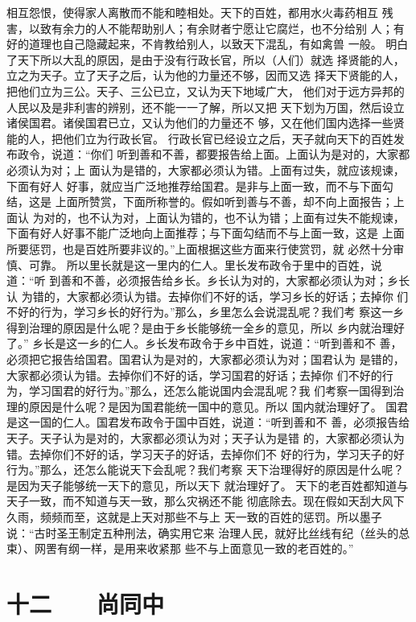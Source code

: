 \documentclass[12pt,UTF8]{ctexbook}
\begin{document}
相互怨恨，使得家人离散而不能和睦相处。天下的百姓，都用水火毒药相互 
残害，以致有余力的人不能帮助别人；有余财者宁愿让它腐烂，也不分给别 
人；有好的道理也自己隐藏起来，不肯教给别人，以致天下混乱，有如禽兽 
一般。 
明白了天下所以大乱的原因，是由于没有行政长官，所以（人们）就选 
择贤能的人，立之为天子。立了天子之后，认为他的力量还不够，因而又选 
择天下贤能的人，把他们立为三公。天子、三公已立，又认为天下地域广大， 
他们对于远方异邦的人民以及是非利害的辨别，还不能一一了解，所以又把 
天下划为万国，然后设立诸侯国君。诸侯国君已立，又认为他们的力量还不 
够，又在他们国内选择一些贤能的人，把他们立为行政长官。 
行政长官已经设立之后，天子就向天下的百姓发布政令，说道：“你们 
听到善和不善，都要报告给上面。上面认为是对的，大家都必须认为对；上 
面认为是错的，大家都必须认为错。上面有过失，就应该规谏，下面有好人 
好事，就应当广泛地推荐给国君。是非与上面一致，而不与下面勾结，这是 
上面所赞赏，下面所称誉的。假如听到善与不善，却不向上面报告；上面认 
为对的，也不认为对，上面认为错的，也不认为错；上面有过失不能规谏， 
下面有好人好事不能广泛地向上面推荐；与下面勾结而不与上面一致，这是 
上面所要惩罚，也是百姓所要非议的。”上面根据这些方面来行使赏罚，就 
必然十分审慎、可靠。 
所以里长就是这一里内的仁人。里长发布政令于里中的百姓，说道：“听 
到善和不善，必须报告给乡长。乡长认为对的，大家都必须认为对；乡长认 
为错的，大家都必须认为错。去掉你们不好的话，学习乡长的好话；去掉你 
们不好的行为，学习乡长的好行为。”那么，乡里怎么会说混乱呢？我们考 
察这一乡得到治理的原因是什么呢？是由于乡长能够统一全乡的意见，所以 
乡内就治理好了。” 
乡长是这一乡的仁人。乡长发布政令于乡中百姓，说道：“听到善和不 
善，必须把它报告给国君。国君认为是对的，大家都必须认为对；国君认为 
是错的，大家都必须认为错。去掉你们不好的话，学习国君的好话；去掉你 
们不好的行为，学习国君的好行为。”那么，还怎么能说国内会混乱呢？我 
们考察一国得到治理的原因是什么呢？是因为国君能统一国中的意见。所以 
国内就治理好了。 
国君是这一国的仁人。国君发布政令于国中百姓，说道：“听到善和不 
善，必须报告给天子。天子认为是对的，大家都必须认为对；天子认为是错 
的，大家都必须认为错。去掉你们不好的话，学习天子的好话，去掉你们不 
好的行为，学习天子的好行为。”那么，还怎么能说天下会乱呢？我们考察 
天下治理得好的原因是什么呢？是因为天子能够统一天下的意见，所以天下 
就治理好了。 
天下的老百姓都知道与天子一致，而不知道与天一致，那么灾祸还不能 
彻底除去。现在假如天刮大风下久雨，频频而至，这就是上天对那些不与上 
天一致的百姓的惩罚。所以墨子说：“古时圣王制定五种刑法，确实用它来 
治理人民，就好比丝线有纪（丝头的总束）、网罟有纲一样，是用来收紧那 
些不与上面意见一致的老百姓的。” 

\chapter{十二　　尚同中}
\end{document}
